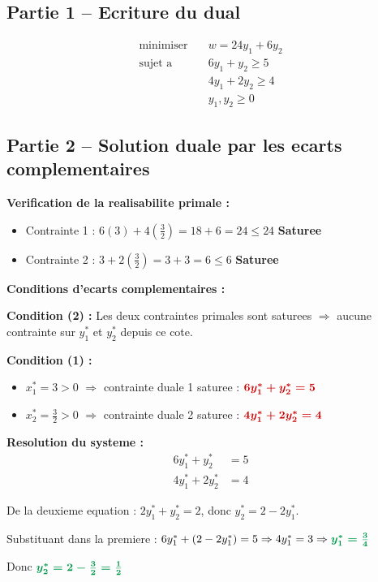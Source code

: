 \documentclass[12pt,a4paper]{article}
\begin{document}
\subsection{Partie 1 -- Ecriture du dual}

\begin{correction}
\begin{align*}
\text{minimiser} \quad & w = 24y_1 + 6y_2\\
\text{sujet a} \quad & 6y_1 + y_2 \geq 5\\
& 4y_1 + 2y_2 \geq 4\\
& y_1, y_2 \geq 0
\end{align*}
\end{correction}

\subsection{Partie 2 -- Solution duale par les ecarts complementaires}

\begin{correction}
\textbf{Verification de la realisabilite primale :}
\begin{itemize}
    \item Contrainte 1 : $6(3) + 4(\frac{3}{2}) = 18 + 6 = 24 \leq 24$ \checkmark \textcolor{importantrouge}{\textbf{Saturee}}
    \item Contrainte 2 : $3 + 2(\frac{3}{2}) = 3 + 3 = 6 \leq 6$ \checkmark \textcolor{importantrouge}{\textbf{Saturee}}
\end{itemize}

\textbf{Conditions d'ecarts complementaires :}

\textbf{Condition (2) :} Les deux contraintes primales sont saturees $\Rightarrow$ aucune contrainte sur $y_1^*$ et $y_2^*$ depuis ce cote.

\textbf{Condition (1) :}
\begin{itemize}
    \item $x_1^* = 3 > 0$ $\Rightarrow$ contrainte duale 1 saturee : $\textcolor{importantrouge}{\boldsymbol{6y_1^* + y_2^* = 5}}$
    \item $x_2^* = \frac{3}{2} > 0$ $\Rightarrow$ contrainte duale 2 saturee : $\textcolor{importantrouge}{\boldsymbol{4y_1^* + 2y_2^* = 4}}$
\end{itemize}

\textbf{Resolution du systeme :}
\begin{align*}
6y_1^* + y_2^* &= 5\\
4y_1^* + 2y_2^* &= 4
\end{align*}

De la deuxieme equation : $2y_1^* + y_2^* = 2$, donc $y_2^* = 2 - 2y_1^*$.

Substituant dans la premiere : $6y_1^* + (2 - 2y_1^*) = 5 \Rightarrow 4y_1^* = 3 \Rightarrow \textcolor{defvert}{\boldsymbol{y_1^* = \frac{3}{4}}}$

Donc $\textcolor{defvert}{\boldsymbol{y_2^* = 2 - \frac{3}{2} = \frac{1}{2}}}$
\end{correction}
\end{document}
